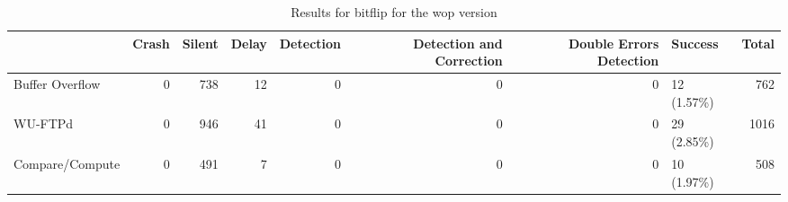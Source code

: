 \begin{table}[t]
	\centering
	\caption{Results for bitflip for the wop version}
	\label{table:end_sim_by_status_wop_1_bitflip}
	\begin{tabular}{lrrrrrrlr}
		\toprule
		                & Crash & Silent & Delay & Detection & Detection and Correction & Double Errors Detection & Success     & Total \\
		\midrule
		Buffer Overflow & 0     & 738    & 12    & 0         & 0                        & 0                       & 12 (1.57\%) & 762   \\
		WU-FTPd         & 0     & 946    & 41    & 0         & 0                        & 0                       & 29 (2.85\%) & 1016  \\
		Compare/Compute & 0     & 491    & 7     & 0         & 0                        & 0                       & 10 (1.97\%) & 508   \\
		\bottomrule
	\end{tabular}
\end{table}
